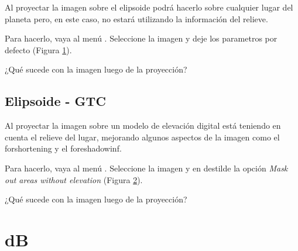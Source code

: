 Al proyectar la imagen sobre el elipsoide podrá hacerlo sobre cualquier lugar del planeta pero, en este caso, no estará utilizando la información del relieve. %

Para hacerlo, vaya al menú . Seleccione la imagen  y deje los parametros por defecto (Figura \ref{fig:elipsoide}).

\begin{figure}[h!]
    \centering
    \hfill
    \caption{}
    \label{fig:elipsoide}
\end{figure}

\begin{que}
    ¿Qué sucede con la imagen luego de la proyección?
\end{que}

\subsection{Elipsoide - GTC}

Al proyectar la imagen sobre un modelo de elevación digital está teniendo en cuenta el relieve del lugar, mejorando algunos aspectos de la imagen como el forshortening y el foreshadowinf.

Para hacerlo, vaya al menú . Seleccione la imagen  y en  destilde la opción \emph{Mask out areas without elevation} (Figura \ref{fig:gtc}).

\begin{figure}[h!]
    \centering
    \hfill
    \caption{}
    \caption{}
    \label{fig:gtc}
\end{figure}

\begin{que}
    ¿Qué sucede con la imagen luego de la proyección?
\end{que}

\section{dB}

